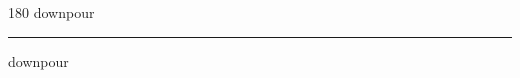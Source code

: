 
\begin{frame}
\begin{center}
\begin{turn}{180}
{\fontsize{2.5cm}{1em}\selectfont downpour}
\end{turn}
\vspace{1em}\par  
\hrule
\vspace{1em}\par  
{\fontsize{2.5cm}{1em}\selectfont downpour}
\end{center}
\end{frame}
